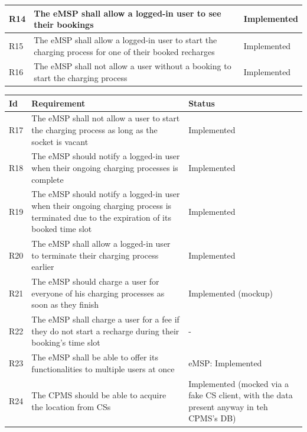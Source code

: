 \documentclass[11pt]{article}
\begin{document}
\begin{table}[H]
\begin{tabularx}{\textwidth}{|>{\centering\hsize=0.15\hsize}X|>{\hsize=1.425\hsize}X|>{\hsize=1.425\hsize}X|}
        \hline
        R14 & The eMSP shall allow a logged-in user to see their bookings & Implemented \\
        \hline
        R15 & The eMSP shall allow a logged-in user to start the charging process for one of their booked recharges & Implemented \\
        \hline
        R16 & The eMSP shall not allow a user without a booking to start the charging process & Implemented \\
        \hline
    \end{tabularx}
    \label{tab:requirements}
\end{table}

\begin{table}[H]
    \centering
    \setlength{\tabcolsep}{18pt}
    \renewcommand{\arraystretch}{1.2}
    \begin{tabularx}{\textwidth}{|>{\centering\hsize=0.15\hsize}X|>{\hsize=1.425\hsize}X|>{\hsize=1.425\hsize}X|}
        \hline
        \textbf{Id} & \textbf{Requirement} & \textbf{Status} \\
        \hline
        R17 & The eMSP shall not allow a user to start the charging process as long as the socket is vacant & Implemented \\
        \hline
        R18 & The eMSP should notify a logged-in user when their ongoing charging processes is complete & Implemented \\
        \hline
        R19 & The eMSP should notify a logged-in user when their ongoing charging process is terminated due to the expiration of its booked time slot & Implemented \\
        \hline
        R20 & The eMSP shall allow a logged-in user to terminate their charging process earlier & Implemented \\
        \hline
        R21 & The eMSP should charge a user for everyone of his charging processes as soon as they finish & Implemented (mockup) \\
        \hline
        R22 & The eMSP shall charge a user for a fee if they do not start a recharge during their booking's time slot & - \\
        \hline
        R23 & The eMSP shall be able to offer its functionalities to multiple users at once & eMSP: Implemented \\
        \hline
        R24 & The CPMS should be able to acquire the location from CSs & Implemented (mocked via a fake CS client, with the data present anyway in teh CPMS's DB) \\

\end{tabularx}
\end{table}
\end{document}
